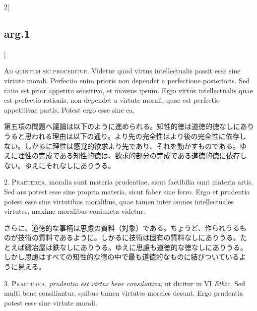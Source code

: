\documentclass[paper=a4paper,fontsize=10pt,jafontsize=9pt,titlepage]{jlreq}
\begin{document}
\begin{paracol}{2}[\subsection{arg.1}]

{\scshape Ad quintum sic proceditur}. Videtur quod virtus
intellectualis possit esse sine virtute morali. Perfectio enim prioris
non dependet a perfectione posterioris. Sed ratio est prior appetitu
sensitivo, et movens ipsum. Ergo virtus intellectualis quae est
perfectio rationis, non dependet a virtute morali, quae est perfectio
appetitivae partis. Potest ergo esse sine ea.

\switchcolumn

第五項の問題へ議論は以下のように進められる。知性的徳は道徳的徳なしにあり
うると思われる理由は以下の通り。より先の完全性はより後の完全性に依存し
ない。しかるに理性は感覚的欲求より先であり、それを動かすものである。ゆ
えに理性の完成である知性的徳は、欲求的部分の完成である道徳的徳に依存し
ない。ゆえにそれなしにありうる。


2. {\scshape Praeterea}, moralia sunt materia prudentiae, sicut
factibilia sunt materia artis. Sed ars potest esse sine propria
materia, sicut faber sine ferro. Ergo et prudentia potest esse sine
virtutibus moralibus, quae tamen inter omnes intellectuales virtutes,
maxime moralibus coniuncta videtur.

\switchcolumn

さらに、道徳的な事柄は思慮の質料（対象）である。ちょうど、作られうるも
のが技術の質料であるように。しかるに技術は固有の質料なしにありうる。た
とえば鍛冶屋は鉄なしにありうる。ゆえに思慮も道徳的な徳なしにありうる。
しかし思慮はすべての知性的な徳の中で最も道徳的なものに結びついているよ
うに見える。


3. {\scshape Praeterea}, {\itshape prudentia est virtus bene
consiliativa}, ut dicitur in VI {\itshape Ethic}. Sed multi bene
consiliantur, quibus tamen virtutes morales desunt. Ergo prudentia
potest esse sine virtute morali.

\switchcolumn


\end{paracol}
\end{document}
